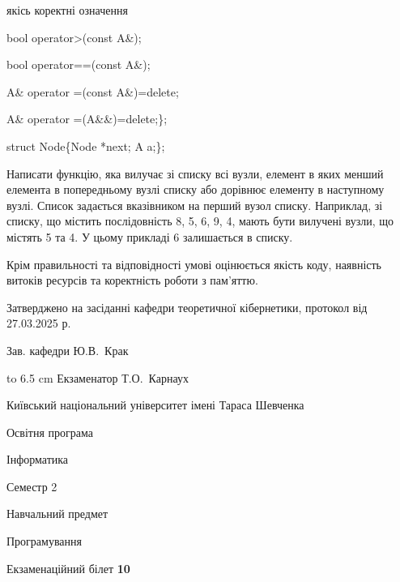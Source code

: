 \documentclass[12pt, ukrainian]{article}
\begin{document}
{\quad  якісь коректні означення 

\quad  bool operator>(const A\&); 

\quad  bool operator==(const A\&); 

\quad A\& operator =(const A\&)=delete; 

\quad  A\& operator =(A\&\&)=delete;\};

struct Node\{Node *next; A a;\};

 Написати функцію, яка вилучає зі списку всі вузли, елемент в яких менший елемента в попередньому вузлі списку або дорівнює елементу в наступному вузлі. Список задається вказівником на перший вузол списку. Наприклад, зі списку, що містить послідовність 8, 5, 6, 9, 4, мають бути вилучені вузли, що містять 5 та 4. У цьому прикладі 6 залишається в списку.

Крім правильності та відповідності умові оцінюється якість коду, наявність витоків ресурсів та коректність роботи з пам'яттю. 

}
{\smallskip\smallskip \begin {scriptsize} Затверджено на засіданні кафедри теоретичної кібернетики, протокол   від   27.03.2025 р.\par\smallskip\smallskip\smallskip\smallskip
{\parbox {6.5 cm} {Зав. кафедри \dotfill Ю.В.~Крак}}\hspace {0.7cm} {\hbox to 6.5 cm { Екзаменатор \dotfill Т.О.~Карнаух}} \end{scriptsize}}
\newpage
{{\begin {scriptsize}\par
{ \center  Київський національний університет імені Тараса Шевченка \par}
{\parbox {5 cm}{Освітня програма \hfill}{\parbox {7 cm}{Інформатика\hfill}}\parbox {6 cm}{\hfill Семестр 2}}\par
{\parbox {5 cm} {Навчальний предмет \hfill}\parbox {7 cm}{Програмування \hfill}\parbox {6cm}{\hfill}\par}\vspace{-15pt} \end{scriptsize}}{\center Екзаменаційний білет \No \textbf { 10 }\par}}
\end{document}

